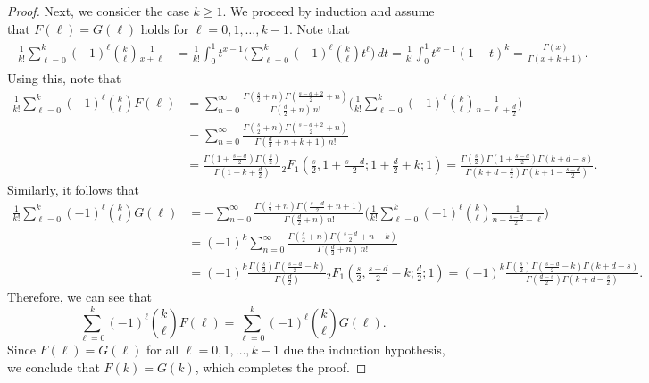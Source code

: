 \documentclass[10pt]{amsart}
\theoremstyle{plain}
\theoremstyle{remark}
\numberwithin{equation}{section}
\begin{document}
\begin{proof}
Next, we consider the case $k \ge 1$. We proceed by induction and assume that $F(\ell)=G(\ell)$ holds for $\ell=0,1,\dots,k-1$.
Note that 
\begin{align}
\begin{split} 
\frac{1}{k!} \sum_{\ell=0}^k (-1)^\ell \binom{k}{\ell} \frac{1}{x+\ell} &=  \frac{1}{k!} \int_0^1 t^{x-1} \bigg( \sum_{\ell=0}^k (-1)^\ell \binom{k}{\ell} t^\ell\bigg) \,dt = \frac{1}{k!}\int_0^1 t^{x-1}(1-t)^{k} = \frac{\Gamma(x)}{\Gamma(x+k+1)}. 
\end{split}
\end{align} 
Using this, note that 
\begin{align*}
\frac{1}{k!} \sum_{\ell=0}^k (-1)^\ell \binom{k}{\ell} F(\ell) &=    \sum_{n=0}^\infty \frac{ \Gamma(\frac{s}{2}+n) \Gamma( \frac{s-d+2}{2}+n )  }{ \Gamma(\frac{d}{2}+n) \, n! } \bigg(  \frac{1}{k!} \sum_{\ell=0}^k (-1)^\ell \binom{k}{\ell}  \frac{1}{n+\ell+\frac{d}{2}} \bigg) 
\\
&= \sum_{n=0}^\infty \frac{ \Gamma(\frac{s}{2}+n) \Gamma( \frac{s-d+2}{2}+n )  }{ \Gamma(\frac{d}{2}+ n+k+1) \, n! } 
\\
&= \frac{ \Gamma(1+\frac{s-d}{2})\Gamma(\frac{s}{2}) }{ \Gamma(1+k+\frac{d}{2}) } {}_2F_1(\tfrac{s}{2},1+\tfrac{s-d}{2}; 1+\tfrac{d}{2}+k;1)
=  \frac{ \Gamma(\tfrac{s}{2})\Gamma(1+\tfrac{s-d}{2})  \Gamma(k+d-s)  }{    \Gamma(k+d-\frac{s}{2}) \Gamma(k+1-\frac{s-d}{2})  }. 
\end{align*}
Similarly, it follows that 
\begin{align*}
\frac{1}{k!} \sum_{\ell=0}^k (-1)^\ell \binom{k}{\ell} G(\ell) &= -     \sum_{n=0}^\infty \frac{ \Gamma(\frac{s}{2}+n) \Gamma( \frac{s-d}{2}+n+1 )  }{ \Gamma(\frac{d}{2}+n) \, n! } \bigg( \frac{1}{k!} \sum_{\ell=0}^k (-1)^\ell \binom{k}{\ell} \frac{1}{ n+\frac{s-d}{2}-\ell } \bigg)
\\
&= (-1)^k\sum_{n=0}^\infty \frac{ \Gamma(\frac{s}{2}+n) \Gamma( \frac{s-d}{2}+n-k )  }{ \Gamma(\frac{d}{2}+n) \, n! } 
\\
&=  (-1)^k\frac{ \Gamma( \frac{s}{2} )\Gamma( \frac{s-d}{2}-k ) }{ \Gamma(\frac{d}{2}) } {}_2F_1(\tfrac{s}{2},\tfrac{s-d}{2}-k;\tfrac{d}{2};1) =  (-1)^k  \frac{ \Gamma( \tfrac{s}{2} )    \Gamma( \tfrac{s-d}{2}-k ) \Gamma(k+d-s) }{ \Gamma(\frac{d-s}{2})\Gamma( k+d-\frac{s}{2} ) }. 
\end{align*}
Therefore, we can see that
\begin{equation}
\sum_{\ell=0}^k (-1)^\ell \binom{k}{\ell} F(\ell)= \sum_{\ell=0}^k (-1)^\ell \binom{k}{\ell} G(\ell).
\end{equation}
Since $F(\ell)=G(\ell)$ for all $\ell=0,1,\dots,k-1$ due the induction hypothesis, we conclude that $F(k)=G(k)$, which completes the proof. 
\end{proof}
\end{document}
